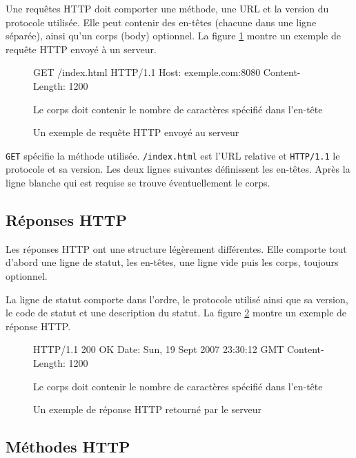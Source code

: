 \documentclass[a4paper, 11pt]{article}
\begin{document}
{		Une requêtes HTTP doit comporter une méthode, une URL et la version du protocole utilisée. Elle peut contenir des en-têtes (chacune dans une ligne séparée), ainsi qu'un corps (body) optionnel. La figure \ref{fig:req_http} montre un exemple de requête HTTP envoyé à un serveur.
		
		\begin{figure}[ht]
		\begin{boxedverbatim}
			GET /index.html HTTP/1.1
			Host: exemple.com:8080
			Content-Length: 1200
			
			Le corps doit contenir le nombre de caractères spécifié dans l'en-tête
		\end{boxedverbatim}
		\caption{Un exemple de requête HTTP envoyé au serveur}
		\label{fig:req_http}
		\end{figure}
		
		\texttt{GET} spécifie la méthode utilisée. \texttt{/index.html} est l'URL relative et \texttt{HTTP/1.1} le protocole et sa version. Les deux lignes suivantes définissent les en-têtes. Après la ligne blanche qui est requise se trouve éventuellement le corps. 
		
	\subsection{Réponses HTTP}
	
		Les réponses HTTP ont une structure légèrement différentes. Elle comporte tout d'abord une ligne de statut, les en-têtes, une ligne vide puis les corps, toujours optionnel. 
		
		La ligne de statut comporte dans l'ordre, le protocole utilisé ainsi que sa version, le code de statut et une description du statut. La figure \ref{fig:rep_http} montre un exemple de réponse HTTP.
		
		\begin{figure}[ht]
		\begin{boxedverbatim}
			HTTP/1.1 200 OK
			Date: Sun, 19 Sept 2007 23:30:12 GMT
			Content-Length: 1200
						
			Le corps doit contenir le nombre de caractères spécifié dans l'en-tête
		\end{boxedverbatim}
		\caption{Un exemple de réponse HTTP retourné par le serveur}
		\label{fig:rep_http}
		\end{figure}

	\subsection{Méthodes HTTP}
	
}
\end{document}
